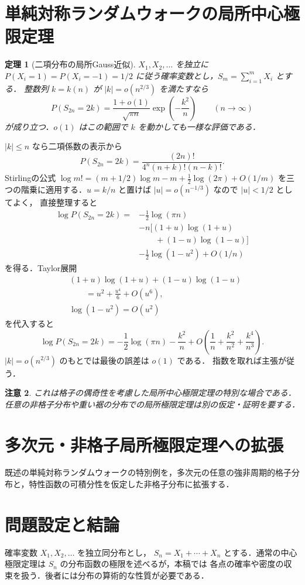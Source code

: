 \documentclass[a5paper,10pt,onecolumn]{jsarticle}
\makeatletter
\theoremstyle{mathnotetheorem}
\newtheorem{theorem}{定理}[section]
\newtheorem{remark}[theorem]{注意}
\renewcommand{\proofname}{証明}
\renewenvironment{proof}[1][\proofname]{%
  \par\pushQED{\qed}\normalfont\topsep4\p@\@plus2\p@\relax
  \trivlist\item[\hskip\labelsep\bfseries #1]\ignorespaces
}{\popQED\endtrivlist\@endpefalse}
\makeatother
\begin{document}
\section{単純対称ランダムウォークの局所中心極限定理}
\begin{theorem}[二項分布の局所Gauss近似]
$X_1,X_2,\ldots$ を独立に $P(X_i=1)=P(X_i=-1)=1/2$
に従う確率変数とし，$S_m=\sum_{i=1}^mX_i$ とする．
整数列 $k=k(n)$ が $|k|=o(n^{2/3})$ を満たすなら
\[
 P(S_{2n}=2k)
 =\frac{1+o(1)}{\sqrt{\pi n}}\exp\!\left(-\frac{k^2}{n}\right)
 \qquad(n\to\infty)
\]
が成り立つ．$o(1)$ はこの範囲で $k$ を動かしても一様な評価である．
\end{theorem}
\begin{proof}
$|k|\le n$ なら二項係数の表示から
\[
 P(S_{2n}=2k)=\frac{(2n)!}{4^n(n+k)!(n-k)!}.
\]
Stirlingの公式
$\log m!=(m+1/2)\log m-m+\frac12\log(2\pi)+O(1/m)$
を三つの階乗に適用する．$u=k/n$ と置けば
$|u|=o(n^{-1/3})$ なので $|u|<1/2$ としてよく，
直接整理すると
\begin{align*}
 \log P(S_{2n}=2k)={}&-\frac12\log(\pi n)\\
 &-n\bigl[(1+u)\log(1+u)\\
 &\qquad+(1-u)\log(1-u)\bigr]\\
 &-\frac12\log(1-u^2)+O(1/n)
\end{align*}
を得る．Taylor展開
\begin{align*}
 &(1+u)\log(1+u)+(1-u)\log(1-u)\\
 &\qquad=u^2+\frac{u^4}{6}+O(u^6),\\
 &\log(1-u^2)=O(u^2)
\end{align*}
を代入すると
\[
 \log P(S_{2n}=2k)
 =-\frac12\log(\pi n)-\frac{k^2}{n}
 +O\!\left(\frac1n+\frac{k^2}{n^2}+\frac{k^4}{n^3}\right).
\]
$|k|=o(n^{2/3})$ のもとでは最後の誤差は $o(1)$ である．
指数を取れば主張が従う．
\end{proof}
\begin{remark}
これは格子の偶奇性を考慮した局所中心極限定理の特別な場合である．
任意の非格子分布や重い裾の分布での局所極限定理は別の仮定・証明を要する．
\end{remark}

\section{多次元・非格子局所極限定理への拡張}
既述の単純対称ランダムウォークの特別例を，多次元の任意の強非周期的格子分布と，特性函数の可積分性を仮定した非格子分布に拡張する．

\section{問題設定と結論}
確率変数 $X_1,X_2,\ldots$ を独立同分布とし，
$S_n=X_1+\cdots+X_n$ とする．通常の中心極限定理は
$S_n$ の分布函数の極限を述べるが，本稿では
各点の確率や密度の収束を扱う．後者には分布の算術的な性質が必要である．
\end{document}
